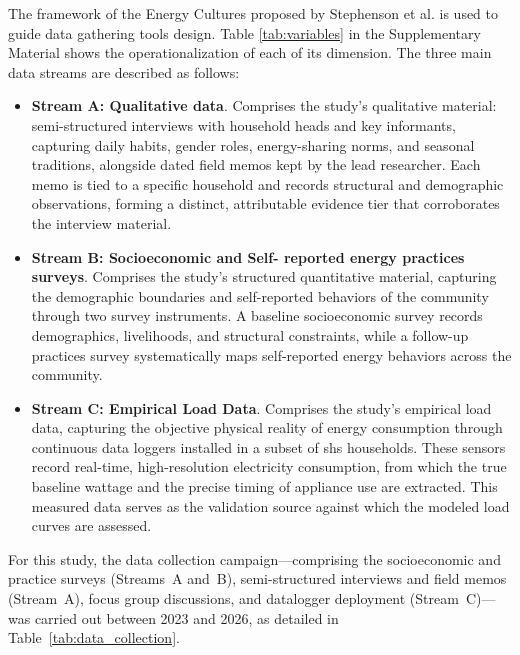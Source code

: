 \documentclass[final,3p,times,onecolumn]{elsarticle}
\begin{document}
The framework of the Energy Cultures proposed by Stephenson et al. \cite{stephenson_energy_2010} is used to guide data gathering tools design. Table \ref{tab:variables} in the Supplementary Material shows the operationalization of each of its dimension. The three main data streams are described as follows:

\begin{itemize}
    \item \textbf{Stream A: Qualitative data}. 
    Comprises the study's qualitative material: semi-structured interviews with household heads and key informants, capturing daily habits, gender roles, energy-sharing norms, and seasonal traditions, alongside dated field memos kept by the lead researcher. Each memo is tied to a specific household and records structural and demographic observations, forming a distinct, attributable evidence tier that corroborates the interview material.
    \item \textbf{Stream B: Socioeconomic and Self- reported energy practices surveys}. 
    Comprises the study's structured quantitative material, capturing the demographic boundaries and self-reported behaviors of the community through two survey instruments. A baseline socioeconomic survey records demographics, livelihoods, and structural constraints, while a follow-up practices survey systematically maps self-reported energy behaviors across the community.
    \item \textbf{Stream C: Empirical Load Data}. 
    Comprises the study's empirical load data, capturing the objective physical reality of energy consumption through continuous data loggers installed in a subset of \gls{shs} households. These sensors record real-time, high-resolution electricity consumption, from which the true baseline wattage and the precise timing of appliance use are extracted. This measured data serves as the validation source against which the modeled load curves are assessed.
\end{itemize}

For this study, the data collection campaign—comprising the socioeconomic and practice surveys (Streams~A and~B), semi-structured interviews and field memos (Stream~A), focus group discussions, and datalogger deployment (Stream~C)—was carried out between 2023 and 2026, as detailed in Table~\ref{tab:data_collection}.
\end{document}
